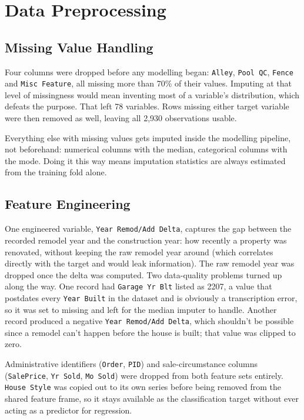 \documentclass[11pt,a4paper]{article}
\let\oldsection\section
\renewcommand{\section}{\clearpage\oldsection}
\begin{document}
\section{Data Preprocessing}\label{data-preprocessing}

\subsection{Missing Value Handling}\label{missing-value-handling}

Four columns were dropped before any modelling began: \texttt{Alley},
\texttt{Pool\ QC}, \texttt{Fence} and \texttt{Misc\ Feature}, all
missing more than 70\% of their values. Imputing at that level of
missingness would mean inventing most of a variable's distribution,
which defeats the purpose. That left 78 variables. Rows missing either
target variable were then removed as well, leaving all 2,930
observations usable.

Everything else with missing values gets imputed inside the modelling
pipeline, not beforehand: numerical columns with the median, categorical
columns with the mode. Doing it this way means imputation statistics are
always estimated from the training fold alone.

\subsection{Feature Engineering}\label{feature-engineering}

One engineered variable, \texttt{Year\ Remod/Add\ Delta}, captures the
gap between the recorded remodel year and the construction year: how
recently a property was renovated, without keeping the raw remodel year
around (which correlates directly with the target and would leak
information). The raw remodel year was dropped once the delta was
computed. Two data-quality problems turned up along the way. One record
had \texttt{Garage\ Yr\ Blt} listed as 2207, a value that postdates
every \texttt{Year\ Built} in the dataset and is obviously a
transcription error, so it was set to missing and left for the median
imputer to handle. Another record produced a negative
\texttt{Year\ Remod/Add\ Delta}, which shouldn't be possible since a
remodel can't happen before the house is built; that value was clipped
to zero.

Administrative identifiers (\texttt{Order}, \texttt{PID}) and
sale-circumstance columns (\texttt{SalePrice}, \texttt{Yr\ Sold},
\texttt{Mo\ Sold}) were dropped from both feature sets entirely.
\texttt{House\ Style} was copied out to its own series before being
removed from the shared feature frame, so it stays available as the
classification target without ever acting as a predictor for regression.
\end{document}
